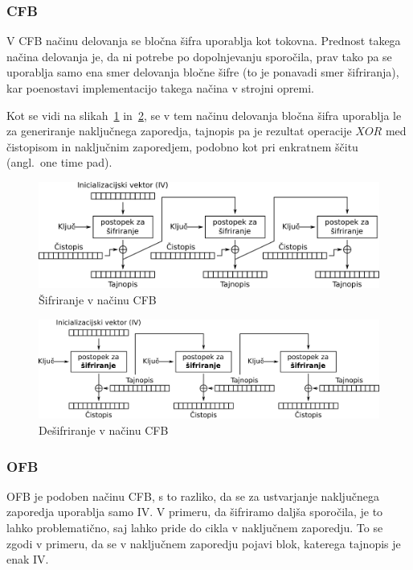 \documentclass[12pt,a4paper,openany,tikz]{book}
\theoremstyle{plain}
\theoremstyle{definition}
\begin{document}
\subsubsection{CFB}
\label{subs:CFB}

V \gls{CFB} načinu delovanja se bločna šifra uporablja kot tokovna. Prednost takega načina delovanja je, da ni potrebe po dopolnjevanju sporočila, prav tako pa se uporablja samo ena smer delovanja bločne šifre (to je ponavadi smer šifriranja), kar poenostavi implementacijo takega načina v strojni opremi.

Kot se vidi na slikah~\ref{fig:cfbenc} in~\ref{fig:cfbdec}, se v tem načinu delovanja bločna šifra uporablja le za generiranje naključnega zaporedja, tajnopis pa je rezultat operacije $XOR$ med čistopisom in naključnim zaporedjem, podobno kot pri enkratnem ščitu (angl.\ one time pad).

\begin{figure}[ht!]
  \centering
    \includegraphics[width=\textwidth]{images/CFB_encryption}
    \caption{Šifriranje v načinu CFB}
\label{fig:cfbenc}
\end{figure}

\begin{figure}[ht!]
  \centering
    \includegraphics[width=\textwidth]{images/CFB_decryption}
    \caption{Dešifriranje v načinu CFB}
\label{fig:cfbdec}
\end{figure}

\subsubsection{OFB}
\label{subs:OFB}

\gls{OFB} je podoben načinu \gls{CFB}, s to razliko, da se za ustvarjanje naključnega zaporedja uporablja samo \gls{IV}. V primeru, da šifriramo daljša sporočila, je to lahko problematično, saj lahko pride do cikla v naključnem zaporedju. To se zgodi v primeru, da se v naključnem zaporedju pojavi blok, katerega tajnopis je enak IV.\@
\end{document}
